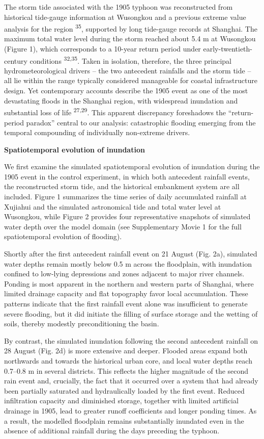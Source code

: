 \documentclass[
]{article}
\begin{document}
The storm tide associated with the 1905 typhoon was reconstructed from
historical tide-gauge information at Wusongkou and a previous extreme
value analysis for the region \textsuperscript{35}, supported by long
tide-gauge records at Shanghai. The maximum total water level during the
storm reached about 5.4 m at Wusongkou (Figure 1), which corresponds to
a 10-year return period under early-twentieth-century conditions
\textsuperscript{32,35}. Taken in isolation, therefore, the three
principal hydrometeorological drivers -- the two antecedent rainfalls
and the storm tide -- all lie within the range typically considered
manageable for coastal infrastructure design. Yet contemporary accounts
describe the 1905 event as one of the most devastating floods in the
Shanghai region, with widespread inundation and substantial loss of life
\textsuperscript{27,29}. This apparent discrepancy foreshadows the
``return-period paradox'' central to our analysis: catastrophic flooding
emerging from the temporal compounding of individually non-extreme
drivers.

\textbf{Spatiotemporal evolution of inundation}

We first examine the simulated spatiotemporal evolution of inundation
during the 1905 event in the control experiment, in which both
antecedent rainfall events, the reconstructed storm tide, and the
historical embankment system are all included. Figure 1 summarizes the
time series of daily accumulated rainfall at Xujiahui and the simulated
astronomical tide and total water level at Wusongkou, while Figure 2
provides four representative snapshots of simulated water depth over the
model domain (see Supplementary Movie 1 for the full spatiotemporal
evolution of flooding).

Shortly after the first antecedent rainfall event on 21 August (Fig.
2a), simulated water depths remain mostly below 0.5 m across the
floodplain, with inundation confined to low-lying depressions and zones
adjacent to major river channels. Ponding is most apparent in the
northern and western parts of Shanghai, where limited drainage capacity
and flat topography favor local accumulation. These patterns indicate
that the first rainfall event alone was insufficient to generate severe
flooding, but it did initiate the filling of surface storage and the
wetting of soils, thereby modestly preconditioning the basin.

By contrast, the simulated inundation following the second antecedent
rainfall on 28 August (Fig. 2d) is more extensive and deeper. Flooded
areas expand both northwards and towards the historical urban core, and
local water depths reach 0.7--0.8 m in several districts. This reflects
the higher magnitude of the second rain event and, crucially, the fact
that it occurred over a system that had already been partially saturated
and hydraulically loaded by the first event. Reduced infiltration
capacity and diminished storage, together with limited artificial
drainage in 1905, lead to greater runoff coefficients and longer ponding
times. As a result, the modelled floodplain remains substantially
inundated even in the absence of additional rainfall during the days
preceding the typhoon.
\end{document}
